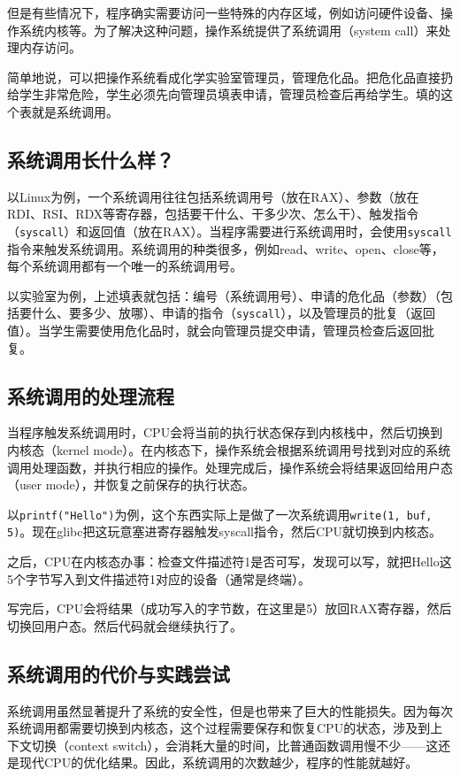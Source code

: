但是有些情况下，程序确实需要访问一些特殊的内存区域，例如访问硬件设备、操作系统内核等。为了解决这种问题，操作系统提供了系统调用（system call）来处理内存访问。

简单地说，可以把操作系统看成化学实验室管理员，管理危化品。把危化品直接扔给学生非常危险，学生必须先向管理员填表申请，管理员检查后再给学生。填的这个表就是系统调用。

\subsection{系统调用长什么样？}

以Linux为例，一个系统调用往往包括系统调用号（放在RAX）、参数（放在RDI、RSI、RDX等寄存器，包括要干什么、干多少次、怎么干）、触发指令（\texttt{syscall}）和返回值（放在RAX）。当程序需要进行系统调用时，会使用\texttt{syscall}指令来触发系统调用。系统调用的种类很多，例如read、write、open、close等，每个系统调用都有一个唯一的系统调用号。

以实验室为例，上述填表就包括：编号（系统调用号）、申请的危化品（参数）（包括要什么、要多少、放哪）、申请的指令（\texttt{syscall}），以及管理员的批复（返回值）。当学生需要使用危化品时，就会向管理员提交申请，管理员检查后返回批复。

\subsection{系统调用的处理流程}

当程序触发系统调用时，CPU会将当前的执行状态保存到内核栈中，然后切换到内核态（kernel mode）。在内核态下，操作系统会根据系统调用号找到对应的系统调用处理函数，并执行相应的操作。处理完成后，操作系统会将结果返回给用户态（user mode），并恢复之前保存的执行状态。

以\texttt{printf("Hello")}为例，这个东西实际上是做了一次系统调用\texttt{write(1, buf, 5)}。现在glibc把这玩意塞进寄存器触发syscall指令，然后CPU就切换到内核态。

之后，CPU在内核态办事：检查文件描述符1是否可写，发现可以写，就把Hello这5个字节写入到文件描述符1对应的设备（通常是终端）。

写完后，CPU会将结果（成功写入的字节数，在这里是5）放回RAX寄存器，然后切换回用户态。然后代码就会继续执行了。

\subsection{系统调用的代价与实践尝试}

系统调用虽然显著提升了系统的安全性，但是也带来了巨大的性能损失。因为每次系统调用都需要切换到内核态，这个过程需要保存和恢复CPU的状态，涉及到上下文切换（context switch），会消耗大量的时间，比普通函数调用慢不少——这还是现代CPU的优化结果。因此，系统调用的次数越少，程序的性能就越好。

